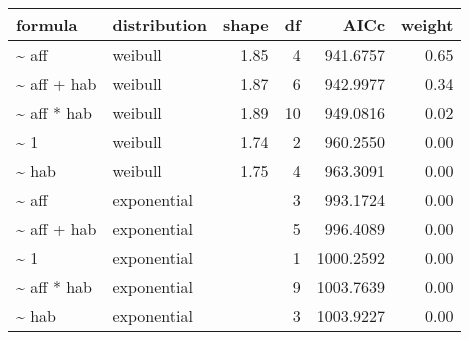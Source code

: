\begin{table}[ht]
\centering
\begin{tabular}{llrrrr}
 formula & distribution & shape & df & AICc & weight \\ 
  \hline
  \~{} aff & weibull & 1.85 & 4 & 941.6757 & 0.65 \\ 
  \~{} aff + hab & weibull & 1.87 & 6 & 942.9977 & 0.34 \\ 
  \~{} aff * hab & weibull & 1.89 & 10 & 949.0816 & 0.02 \\ 
  \~{} 1 & weibull & 1.74 & 2 & 960.2550 & 0.00 \\ 
  \~{} hab & weibull & 1.75 & 4 & 963.3091 & 0.00 \\ 
  \~{} aff & exponential &  & 3 & 993.1724 & 0.00 \\ 
  \~{} aff + hab & exponential &  & 5 & 996.4089 & 0.00 \\ 
  \~{} 1 & exponential &  & 1 & 1000.2592 & 0.00 \\ 
  \~{} aff * hab & exponential &  & 9 & 1003.7639 & 0.00 \\ 
  \~{} hab & exponential &  & 3 & 1003.9227 & 0.00 \\ 
  \end{tabular}
\label{tab:brach}
\end{table}
